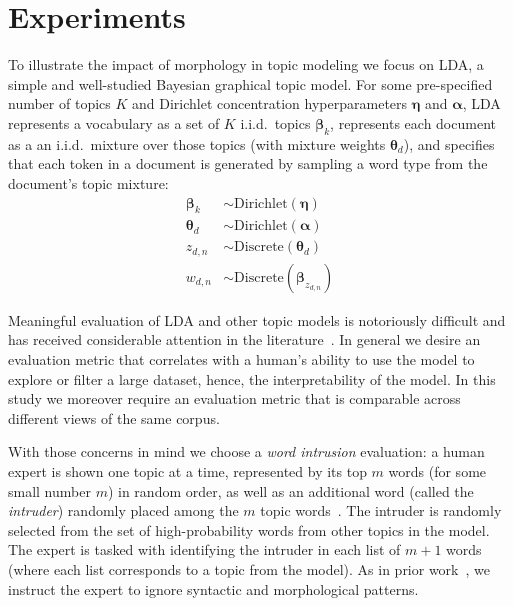\documentclass[11pt,letterpaper]{article}
\renewcommand{\vec}{\boldsymbol}   %
\newcommand{\valpha}{{\vec{\alpha}}}
\newcommand{\vtheta}{{\vec{\theta}}}
\newcommand{\veta}{{\vec{\eta}}}
\newcommand{\vbeta}{{\vec{\beta}}}
\newcommand{\Discrete}{\ensuremath{\mathrm{Discrete}}}
\newcommand{\Dirichlet}{\ensuremath{\mathrm{Dirichlet}}}
\begin{document}
{\section{Experiments}\label{sec:experiments}

To illustrate the impact of morphology in topic modeling we focus on
LDA, a simple and well-studied Bayesian graphical topic model.
For some pre-specified
number of topics $K$ and Dirichlet concentration hyperparameters
$\veta$ and $\valpha$, LDA represents a vocabulary as a set of $K$
i.i.d.\ topics $\vbeta_k$, represents each document as a
an i.i.d.\ mixture over those topics (with mixture weights
$\vtheta_d$), and specifies that each token in a document is
generated by sampling a word type from the document's topic mixture:
\begin{align*}
    \vbeta_k  & \sim \Dirichlet\left(\veta\right) \\
    \vtheta_d & \sim \Dirichlet\left(\valpha\right) \\
    z_{d,n}              & \sim \Discrete\left(\vtheta_d\right) \\
    w_{d,n}              & \sim \Discrete\left(\vbeta_{z_{d,n}}\right)
\end{align*}

Meaningful evaluation of LDA and other topic models is notoriously
difficult and has received considerable attention in the
literature~\cite{chang2009,wallach2009a,newman2010,mimno2011}.
In general we desire an evaluation metric that correlates with a
human's ability to use the model to explore or filter a large dataset,
hence, the interpretability of the model.  In this study we moreover
require an evaluation metric that is comparable across different views
of the same corpus.

With those concerns in mind we choose a \emph{word intrusion}
evaluation:
a human expert is shown one topic at a time, represented
by its top $m$ words (for some small number $m$) in random order, as
well as an additional word (called the \emph{intruder}) randomly placed
among the $m$ topic words~\cite{chang2009}.
The intruder is randomly selected from the set of high-probability
words from other topics in the model.
The expert is tasked with identifying the intruder in each list of
$m + 1$ words (where each list corresponds to a topic from the model).
As in prior work~\cite{chang2009}, we instruct the expert to ignore
syntactic and morphological patterns.

}
\end{document}
